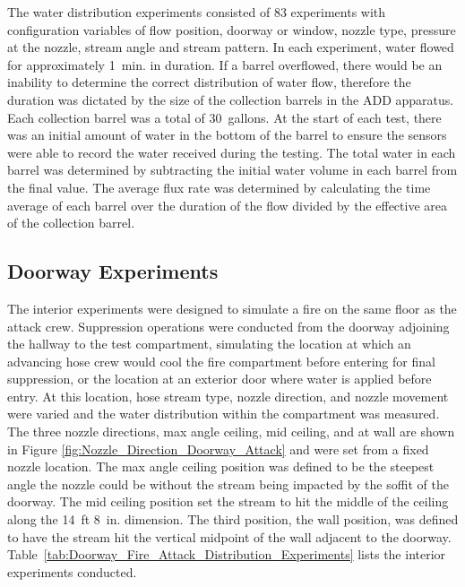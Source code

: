 \documentclass[12pt,oneside]{book}
\begin{document}
The water distribution experiments consisted of 83 experiments with configuration variables of flow position, doorway or window, nozzle type, pressure at the nozzle, stream angle and stream pattern. In each experiment, water flowed for approximately 1~min. in duration. If a barrel overflowed, there would be an inability to determine the correct distribution of water flow, therefore the duration was dictated by the size of the collection barrels in the ADD apparatus. Each collection barrel was a total of 30~gallons.  At the start of each test, there was an initial amount of water in the bottom of the barrel to ensure the sensors were able to record the water received during the testing. The total water in each barrel was determined by subtracting the initial water volume in each barrel from the final value. The average flux rate was determined by calculating the time average of each barrel over the duration of the flow divided by the effective area of the collection barrel. 

\subsection{Doorway Experiments}
\label{int_tests}
The interior experiments were designed to simulate a fire on the same floor as the attack crew. Suppression operations were conducted from the doorway adjoining the hallway to the test compartment, simulating the location at which an advancing hose crew would cool the fire compartment before entering for final suppression, or the location at an exterior door where water is applied before entry. At this location, hose stream type, nozzle direction, and nozzle movement were varied and the water distribution within the compartment was measured. The three nozzle directions, max angle ceiling, mid ceiling, and at wall are shown in Figure \ref{fig:Nozzle_Direction_Doorway_Attack} and were set from a fixed nozzle location. The max angle ceiling position was defined to be the steepest angle the nozzle could be without the stream being impacted by the soffit of the doorway. The mid ceiling position set the stream to hit the middle of the ceiling along the 14~ft 8~in. dimension. The third position, the wall position, was defined to have the stream hit the vertical midpoint of the wall adjacent to the doorway. Table~\ref{tab:Doorway_Fire_Attack_Distribution_Experiments} lists the interior experiments conducted.
\end{document}
